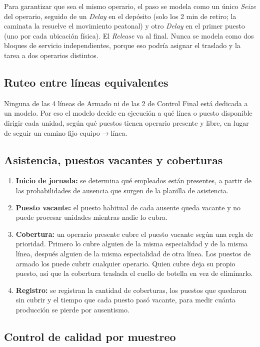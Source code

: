\documentclass[11pt,a4paper]{article}
\begin{document}
Para garantizar que sea el mismo operario, el paso se modela como un único \emph{Seize} del operario, seguido de un \emph{Delay} en el depósito (solo los 2 min de retiro; la caminata la resuelve el movimiento peatonal) y otro \emph{Delay} en el primer puesto (uno por cada ubicación física). El \emph{Release} va al final. Nunca se modela como dos bloques de servicio independientes, porque eso podría asignar el traslado y la tarea a dos operarios distintos.

\subsection{Ruteo entre líneas equivalentes}

Ninguna de las 4 líneas de Armado ni de las 2 de Control Final está dedicada a un modelo. Por eso el modelo decide en ejecución a qué línea o puesto disponible dirigir cada unidad, según qué puestos tienen operario presente y libre, en lugar de seguir un camino fijo equipo\(\rightarrow\)línea.

\subsection{Asistencia, puestos vacantes y coberturas}

\begin{enumerate}
  \item \textbf{Inicio de jornada:} se determina qué empleados están presentes, a partir de las probabilidades de ausencia que surgen de la planilla de asistencia.
  \item \textbf{Puesto vacante:} el puesto habitual de cada ausente queda vacante y no puede procesar unidades mientras nadie lo cubra.
  \item \textbf{Cobertura:} un operario presente cubre el puesto vacante según una regla de prioridad. Primero lo cubre alguien de la misma especialidad y de la misma línea, después alguien de la misma especialidad de otra línea. Los puestos de armado los puede cubrir cualquier operario. Quien cubre deja su propio puesto, así que la cobertura traslada el cuello de botella en vez de eliminarlo.
  \item \textbf{Registro:} se registran la cantidad de coberturas, los puestos que quedaron sin cubrir y el tiempo que cada puesto pasó vacante, para medir cuánta producción se pierde por ausentismo.
\end{enumerate}

\subsection{Control de calidad por muestreo}
\end{document}
